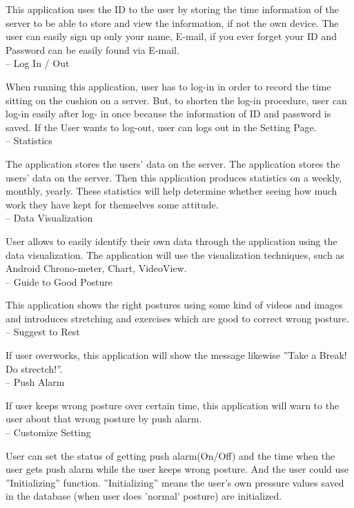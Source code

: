 \documentclass[conference]{IEEEtran}
\begin{document}
This application uses the ID to the user by storing the time information of the server to be able to store and view the information, if not the own device. The user can easily sign up only your name, E-mail, if you ever forget your ID and Password can be easily found via E-mail.\\

-- Log In / Out

When running this application, user has to log-in in order to record the time sitting on the cushion on a server. But, to shorten the log-in procedure, user can log-in easily after log- in once because the information of ID and password is saved. If the User wants to log-out, user can logs out in the Setting Page.\\

-- Statistics

The application stores the users' data on the server. The application stores the users' data on the server. Then this application produces statistics on a weekly, monthly, yearly. These statistics will help determine whether seeing how much work they have kept for themselves some attitude.\\

-- Data Visualization

User allows to easily identify their own data through the application using the data visualization. The application will use the visualization techniques, such as Android Chrono-meter, Chart, VideoView.\\

-- Guide to Good Posture

This application shows the right postures using some kind of videos and images and introduces stretching and exercises which are good to correct wrong posture.\\

-- Suggest to Rest

If user overworks, this application will show the message likewise ''Take a Break! Do strectch!''.\\

-- Push Alarm

If user keeps wrong posture over certain time, this application will warn to the user about that wrong posture by push alarm.\\

-- Customize Setting

User can set the status of getting push alarm(On/Off) and the time when the user gets push alarm while the user keeps wrong posture. And the user could use ''Initializing'' function. ''Initializing'' means the user's own pressure values saved in the database (when user does 'normal' posture) are initialized.\\\\\\
\end{document}

